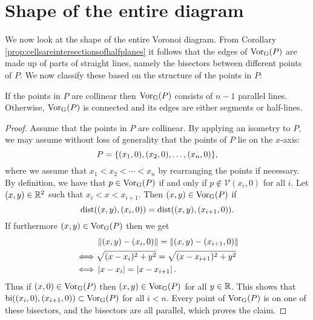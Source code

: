 \section{Shape of the entire diagram}
We now look at the shape of the entire Voronoi diagram. From Corollary \ref{prop:cellsareintersectionsofhalfplanes} it follows that the edges of $\operatorname{Vor_{G}}(P)$ are made up of parts of straight lines, namely the bisectors between different points of $P$. We now classify these based on the structure of the points in $P$:
\begin{thm} \label{prop:structureofentirevoronoidiagram}
If the points in $P$ are collinear then $\operatorname{Vor_{G}}(P)$ consists of $n - 1$ parallel lines. Otherwise, $\operatorname{Vor_{G}}(P)$ is connected and its edges are either segments or half-lines.
\end{thm}
\begin{proof}
Assume that the points in $P$ are collinear. By applying an isometry to $P$, we may assume without loss of generality that the points of $P$ lie on the $x$-axis:
\[
    P = \{(x_1, 0), (x_2, 0), \ldots, (x_n, 0)\},
\]
where we assume that $x_1 < x_2 < \cdots < x_n$ by rearranging the points if necessary. By definition, we have that $p \in \operatorname{Vor_{G}}(P)$ if and only if $p \not\in \mathcal{V}(x_i, 0)$ for all $i$. Let $(x, y) \in \mathbb{R}^2$ such that $x_i < x < x_{i+1}$. Then $(x, y) \in \operatorname{Vor_{G}}(P)$ if
\[
    \operatorname{dist}((x, y), (x_i, 0)) = \operatorname{dist}((x, y), (x_{i+1}, 0)).
\]
If furthermore $(x, y) \in \operatorname{Vor_{G}}(P)$ then we get
\begin{align*}
    &\left\lVert (x, y) - (x_i, 0) \right\rVert = \left\lVert (x, y) - (x_{i+1}, 0) \right\rVert \\
    \iff &\sqrt{(x - x_i)^2 + y^2} = \sqrt{(x - x_{i+1})^2 + y^2} \\
    \iff &\left\lvert x - x_i \right\rvert = \left\lvert x - x_{i+1} \right\rvert.
\end{align*}
Thus if $(x, 0) \in \operatorname{Vor_{G}}(P)$ then $(x, y) \in \operatorname{Vor_{G}}(P)$ for all $y \in \mathbb{R}$. This shows that $\operatorname{bi}((x_i, 0), (x_{i+1}, 0)) \subset \operatorname{Vor_{G}}(P)$ for all $i < n$. Every point of $\operatorname{Vor_{G}}(P)$ is on one of these bisectors, and the bisectors are all parallel, which proves the claim.


\end{proof}
